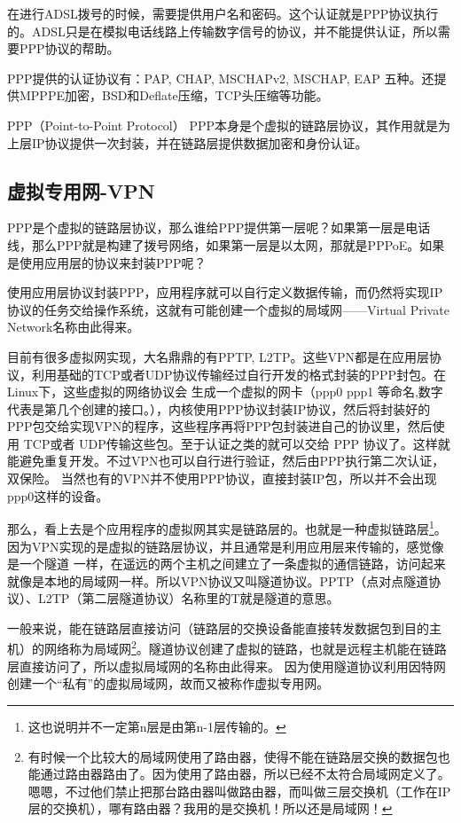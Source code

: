 
在进行ADSL拨号的时候，需要提供用户名和密码。这个认证就是PPP协议执行的。ADSL只是在模拟电话线路上传输数字信号的协议，并不能提供认证，所以需要PPP协议的帮助。

PPP提供的认证协议有：PAP, CHAP, MSCHAPv2, MSCHAP, EAP 五种。还提供MPPPE加密，BSD和Deflate压缩，TCP头压缩等功能。

PPP（Point-to-Point Protocol） PPP本身是个虚拟的链路层协议，其作用就是为上层IP协议提供一次封装，并在链路层提供数据加密和身份认证。

\subsection{虚拟专用网-VPN}

PPP是个虚拟的链路层协议，那么谁给PPP提供第一层呢？如果第一层是电话线，那么PPP就是构建了拨号网络，如果第一层是以太网，那就是PPPoE。如果是使用应用层的协议来封装PPP呢？

使用应用层协议封装PPP，应用程序就可以自行定义数据传输，而仍然将实现IP协议的任务交给操作系统，这就有可能创建一个虚拟的局域网——Virtual Private Network名称由此得来。

目前有很多虚拟网实现，大名鼎鼎的有PPTP, L2TP。这些VPN都是在应用层协议，利用基础的TCP或者UDP协议传输经过自行开发的格式封装的PPP封包。在Linux下，这些虚拟的网络协议会
生成一个虚拟的网卡（ppp0 ppp1 等命名,数字代表是第几个创建的接口。），内核使用PPP协议封装IP协议，然后将封装好的PPP包交给实现VPN的程序，这些程序再将PPP包封装进自己的协议里，然后使用 TCP或者 UDP传输这些包。至于认证之类的就可以交给 PPP 协议了。这样就能避免重复开发。不过VPN也可以自行进行验证，然后由PPP执行第二次认证，双保险。%
当然也有的VPN并不使用PPP协议，直接封装IP包，所以并不会出现ppp0这样的设备。

那么，看上去是个应用程序的虚拟网其实是链路层的。也就是一种虚拟链路层\footnote{这也说明并不一定第n层是由第n-1层传输的。}。
因为VPN实现的是虚拟的链路层协议，并且通常是利用应用层来传输的，感觉像是一个隧道
一样，在遥远的两个主机之间建立了一条虚拟的通信链路，访问起来就像是本地的局域网一样。所以VPN协议又叫隧道协议。PPTP（点对点隧道协议）、L2TP（第二层隧道协议）名称里的T就是隧道的意思。

一般来说，能在链路层直接访问（链路层的交换设备能直接转发数据包到目的主机）的网络称为局域网\footnote{有时候一个比较大的局域网使用了路由器，使得不能在链路层交换的数据包也能通过路由器路由了。因为使用了路由器，所以已经不太符合局域网定义了。嗯嗯，不过他们禁止把那台路由器叫做路由器，而叫做三层交换机（工作在IP层的交换机），哪有路由器？我用的是交换机！所以还是局域网！}。隧道协议创建了虚拟的链路，也就是远程主机能在链路层直接访问了，所以虚拟局域网的名称由此得来。
因为使用隧道协议利用因特网创建一个“私有”的虚拟局域网，故而又被称作虚拟专用网。

